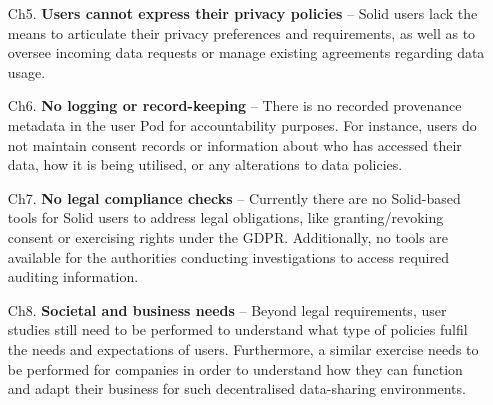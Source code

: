 \begin{enumerate}
    \item [Ch5.] \textbf{Users cannot express their privacy policies} -- Solid users lack the means to articulate their privacy preferences and requirements, as well as to oversee incoming data requests or manage existing agreements regarding data usage.
    \item [Ch6.] \textbf{No logging or record-keeping} -- There is no recorded provenance metadata in the user Pod for accountability purposes. For instance, users do not maintain consent records or information about who has accessed their data, how it is being utilised, or any alterations to data policies.
    \item [Ch7.] \textbf{No legal compliance checks} -- Currently there are no Solid-based tools for Solid users to address legal obligations, like granting/revoking consent or exercising rights under the GDPR. Additionally, no tools are available for the authorities conducting investigations to access required auditing information.
    \item [Ch8.] \textbf{Societal and business needs} -- Beyond legal requirements, user studies still need to be performed to understand what type of policies fulfil the needs and expectations of users. Furthermore, a similar exercise needs to be performed for companies in order to understand how they can function and adapt their business for such decentralised data-sharing environments.
\end{enumerate}